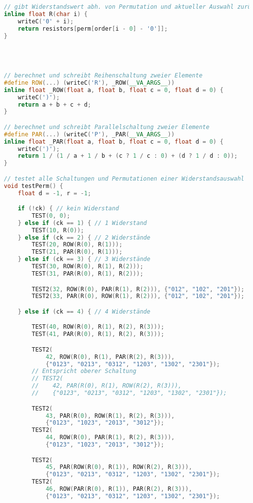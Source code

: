 \documentclass[a4paper,10pt,ngerman]{scrartcl}
\begin{document}
\begin{lstlisting}[language=C++]
// gibt Widerstandswert abh. von Permutation und aktueller Auswahl zurück
inline float R(char i) {
    writeC('0' + i);
    return resistors[perm[order[i - 0] - '0']];
}




// berechnet und schreibt Reihenschaltung zweier Elemente
#define ROW(...) (writeC('R'), _ROW(__VA_ARGS__))
inline float _ROW(float a, float b, float c = 0, float d = 0) {
    writeC(')');
    return a + b + c + d;
}

// berechnet und schreibt Parallelschaltung zweier Elemente
#define PAR(...) (writeC('P'), _PAR(__VA_ARGS__))
inline float _PAR(float a, float b, float c = 0, float d = 0) {
    writeC(')');
    return 1 / (1 / a + 1 / b + (c ? 1 / c : 0) + (d ? 1 / d : 0));
}

// testet alle Schaltungen und Permutationen einer Widerstandsauswahl
void testPerm() {
    float d = -1, r = -1;

    if (!ck) { // kein Widerstand
        TEST(0, 0);
    } else if (ck == 1) { // 1 Widerstand
        TEST(10, R(0));
    } else if (ck == 2) { // 2 Widerstände
        TEST(20, ROW(R(0), R(1)));
        TEST(21, PAR(R(0), R(1)));
    } else if (ck == 3) { // 3 Widerstände
        TEST(30, ROW(R(0), R(1), R(2)));
        TEST(31, PAR(R(0), R(1), R(2)));

        TEST2(32, ROW(R(0), PAR(R(1), R(2))), {"012", "102", "201"});
        TEST2(33, PAR(R(0), ROW(R(1), R(2))), {"012", "102", "201"});

    } else if (ck == 4) { // 4 Widerstände

        TEST(40, ROW(R(0), R(1), R(2), R(3)));
        TEST(41, PAR(R(0), R(1), R(2), R(3)));

        TEST2(
            42, ROW(R(0), R(1), PAR(R(2), R(3))),
            {"0123", "0213", "0312", "1203", "1302", "2301"});
        // Entspricht oberer Schaltung
        // TEST2(
        //    42, PAR(R(0), R(1), ROW(R(2), R(3))),
        //    {"0123", "0213", "0312", "1203", "1302", "2301"});

        TEST2(
            43, PAR(R(0), ROW(R(1), R(2), R(3))),
            {"0123", "1023", "2013", "3012"});
        TEST2(
            44, ROW(R(0), PAR(R(1), R(2), R(3))),
            {"0123", "1023", "2013", "3012"});

        TEST2(
            45, PAR(ROW(R(0), R(1)), ROW(R(2), R(3))),
            {"0123", "0213", "0312", "1203", "1302", "2301"});
        TEST2(
            46, ROW(PAR(R(0), R(1)), PAR(R(2), R(3))),
            {"0123", "0213", "0312", "1203", "1302", "2301"});


\end{lstlisting}
\end{document}
